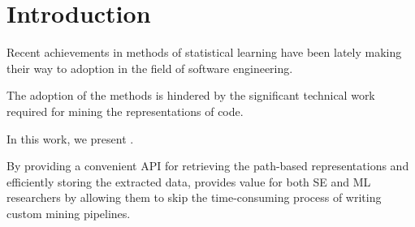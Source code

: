\section{Introduction}

Recent achievements in methods of statistical learning have been lately making their way
to adoption in the field of software engineering.


The adoption of the methods is hindered by the significant technical work required for mining the representations of code.

In this work, we present \toolname.

By providing a convenient API for retrieving the path-based
representations and efficiently storing the extracted data, \toolname provides value for
both SE and ML researchers by allowing them to skip the time-consuming process of writing
custom mining pipelines.
